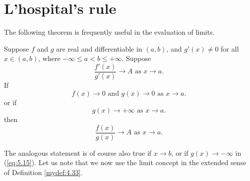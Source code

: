 \section{L'hospital's rule}
The following theorem is frequently useful in the evaluation of limits.

\begin{thm}
    \label{thm:5.13}
    Suppose $f$ and $g$ are real and differentiable in $(a, b)$, 
    and $g'(x) \neq 0$ for all $x \in (a, b)$, 
    where $-\infty \leq a < b \leq + \infty$. 
    Suppose
    \begin{equation}
        \label{eq:5.13}
        \frac{f'(x)}{g'(x)}\rightarrow A 
        \text{ as } x \rightarrow a.
    \end{equation}
    If 
    \begin{equation}
        \label{eq:5.14}
        f(x) \rightarrow 0
        \text{ and }
        g(x) \rightarrow 0
        \text{ as } x \rightarrow a.
    \end{equation}
    or if 
    \begin{equation}
        \label{eq:5.15}
        g(x) \rightarrow +\infty 
        \text{ as } x \rightarrow a.
    \end{equation}
    then
    \begin{equation}
        \label{eq:5.16}
        \frac{f(x)}{g(x)} \rightarrow A
        \text{ as } x \rightarrow a.
    \end{equation}
\end{thm}
The analogous statement is of course also true if $x \rightarrow b$, 
or if $g(x) \rightarrow -\infty $ in (\ref{eq:5.15}). 
Let us note that we now use the limit concept in the extended sense of
Definition \ref{mydef:4.33}.
